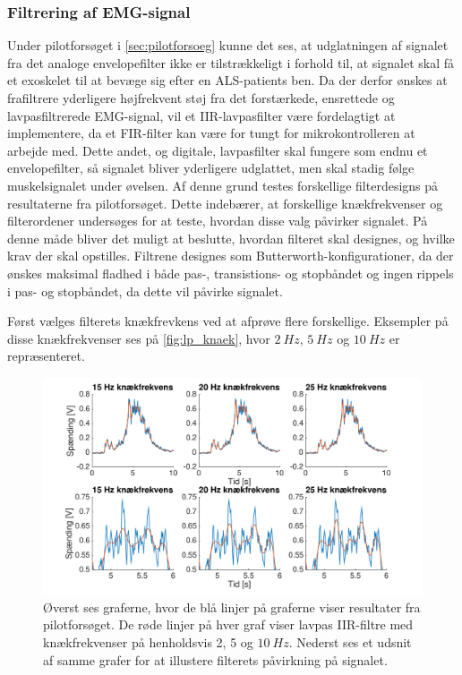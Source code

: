 \subsubsection{Filtrering af EMG-signal} \label{sec:lavpas_krav}
Under pilotforsøget i \autoref{sec:pilotforsoeg} kunne det ses, at udglatningen af signalet fra det analoge envelopefilter ikke er tilstrækkeligt i forhold til, at signalet skal få et exoskelet til at bevæge sig efter en ALS-patients ben. Da der derfor ønskes at frafiltrere yderligere højfrekvent støj fra det forstærkede, ensrettede og lavpasfiltrerede EMG-signal, vil et IIR-lavpasfilter være fordelagtigt at implementere, da et FIR-filter kan være for tungt for mikrokontrolleren at arbejde med. Dette andet, og digitale, lavpasfilter skal fungere som endnu et envelopefilter, så signalet bliver yderligere udglattet, men skal stadig følge muskelsignalet under øvelsen.
Af denne grund testes forskellige filterdesigns på resultaterne fra pilotforsøget. Dette indebærer, at forskellige knækfrekvenser og filterordener undersøges for at teste, hvordan disse valg påvirker signalet. På denne måde bliver det muligt at beslutte, hvordan filteret skal designes, og hvilke krav der skal opstilles. Filtrene designes som Butterworth-konfigurationer, da der ønskes maksimal fladhed i både pas-, transistions- og stopbåndet og ingen rippels i pas- og stopbåndet, da dette vil påvirke signalet.

Først vælges filterets knækfrevkens ved at afprøve flere forskellige. Eksempler på disse knækfrekvenser ses på \autoref{fig:lp_knaek}, hvor $2~Hz$, $5~Hz$ og $10~Hz$ er repræsenteret. 

\begin{figure} [H]
\centering
\includegraphics[width=1.0\textwidth]{figures/problemloesning/lavpas_knaek.pdf}
\caption{Øverst ses graferne, hvor de blå linjer på graferne viser resultater fra pilotforsøget. De røde linjer på hver graf viser lavpas IIR-filtre med knækfrekvenser på henholdsvis 2, 5 og $10~Hz$. Nederst ses et udsnit af samme grafer for at illustere filterets påvirkning på signalet.}
\label{fig:lp_knaek}
\end{figure} 

